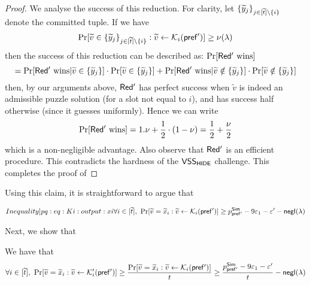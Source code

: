 \begin{proof}
We analyse the success of this reduction. For clarity, let $\{\widetilde{y}_j\}_{j \in [\widetilde{t}]\setminus \{i\}}$ denote the committed tuple. If we have 
$$\Pr[\widetilde{v} \in \{\widetilde{y}_j\}_{j \in [\widetilde{t}]\setminus \{i\}}: \widetilde{v} \gets \mathcal{K}_i(\mathsf{pref'})] \geq \nu(\lambda)$$
then the success of this reduction can be described as: $\Pr[\mathsf{Red'} ~\textnormal{wins}]$ $$=\Pr[\mathsf{Red'}~\textnormal{wins}| \widetilde{v} \in \{\widetilde{y}_j\}]\cdot\Pr[\widetilde{v} \in \{\widetilde{y}_j\}] + \Pr[\mathsf{Red'}~\textnormal{wins}| \widetilde{v} \notin \{\widetilde{y}_j\}]\cdot\Pr[\widetilde{v} \notin \{\widetilde{y}_j\}]$$ 
then, by our arguments above, $\mathsf{Red'}$ has perfect success when $\tilde{v}$ is indeed an admissible puzzle solution (for a slot not equal to $i$), and has success half otherwise (since it guesses uniformly). Hence we can write $$\Pr[\mathsf{Red'} ~\textnormal{wins}] = 1.\nu + \frac{1}{2}\cdot(1-\nu) = \frac{1}{2} + \frac{\nu}{2}$$ which is a non-negligible advantage. Also observe that $\mathsf{Red'}$ is an efficient procedure. This contradicts the hardness of the $\mathsf{VSS}_\mathsf{HIDE}$ challenge. This completes the proof of   

\end{proof}

Using this claim, it is straightforward to argue that 

\begin{equation}\label[Inequality]{pq:eq:Ki:output:xi}
    \forall i \in [\tilde{t}],~\Pr[\tilde{v} = \tilde{x}_i: \tilde{v} \gets \mcal{K}_i(\msf{pref'})] \geq p^{\msf{Sim}}_{\msf{pref'}} - 9\epsilon_1 - \epsilon'- \negl(\secpar)
\end{equation}

Next, we show that 

\begin{MyClaim}\label{pq:claim:Kiprime:lowerbound}
We have that
$$\forall i \in [\widetilde{t}],~\Pr[\widetilde{v} = \widetilde{x}_i: \widetilde{v} \gets \mathcal{K}_i'(\mathsf{pref'})] \geq 
\frac{\Pr[\widetilde{v} = \widetilde{x}_i: \widetilde{v} \gets \mathcal{K}_i(\mathsf{pref'})]}{t} \geq \frac{p^{\mathsf{Sim}}_{\mathsf{pref'}} - 9\varepsilon_1 - \varepsilon'}{t} -\mathsf{negl}(\lambda)$$
\end{MyClaim}

